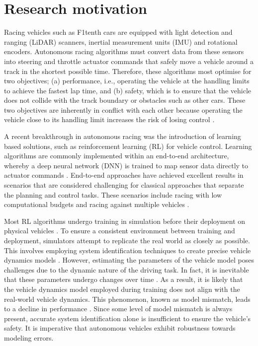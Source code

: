 \section{Research motivation}

Racing vehicles such as F1tenth cars are equipped with light detection and ranging (LiDAR) scanners, inertial measurement units (IMU) and rotational encoders.
Autonomous racing algorithms must convert data from these sensors into steering and throttle actuator commands  that safely move a vehicle around a track in the shortest possible time.
Therefore, these algorithms most optimise for two objectives;
(a) performance, i.e., operating the vehicle at the handling limits to achieve the fastest lap time, and (b) safety, which is to ensure that the vehicle does not collide with the track boundary or obstacles such as other cars.
These two objectives are inherently in conflict with each other because operating the vehicle close to its handling limit increases the risk of losing control \cite{Betz2021}.

A recent breakthrough in autonomous racing was the introduction of learning based solutions, such as reinforcement learning (RL) for vehicle control.
Learning algorithms are commonly implemented within an end-to-end architecture, whereby a deep neural network (DNN) is trained to map sensor data directly to actuator commands \cite{Betz2021}.
End-to-end approaches have achieved excellent results in scenarios that are considered challenging for classical approaches that separate the planning and control tasks.
These scenarios include racing with low computational budgets \cite{Evans2021a, Tatulea-Codrean2020} and racing against multiple vehicles \cite{Song2021, Wurman2022}.

Most RL algorithms undergo training in simulation before their deployment on physical vehicles \cite{Babu2020, Zhou2020}.
To ensure a consistent environment between training and deployment, simulators attempt to replicate the real world as closely as possible.
This involves employing system identification techniques to create precise vehicle dynamics models \cite{Zhou2020}.
However, estimating the parameters of the vehicle model poses challenges due to the dynamic nature of the driving task. 
In fact, it is inevitable that these parameters undergo changes over time \cite{Zhao2017}.
As a result, it is likely that the vehicle dynamics model employed during training does not align with the real-world vehicle dynamics. 
This phenomenon, known as model mismatch, leads to a decline in performance \cite{Ghignone2022}. 
Since some level of model mismatch is always present, accurate system identification alone is insufficient to ensure the vehicle's safety. 
It is imperative that autonomous vehicles exhibit robustness towards modeling errors.

